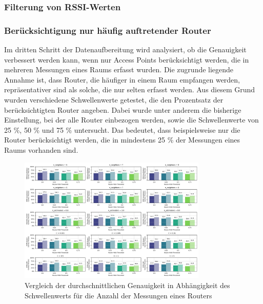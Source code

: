 \subsubsection{Filterung von RSSI-Werten}
\subsubsection{Berücksichtigung nur häufig auftretender Router}

Im dritten Schritt der Datenaufbereitung wird analysiert, ob die Genauigkeit verbessert werden kann, wenn nur Access Points berücksichtigt werden, die in mehreren Messungen eines Raums erfasst wurden. Die zugrunde liegende Annahme ist, dass Router, die häufiger in einem Raum empfangen werden, repräsentativer sind als solche, die nur selten erfasst werden. Aus diesem Grund wurden verschiedene Schwellenwerte getestet, die den Prozentsatz der berücksichtigten Router angeben. Dabei wurde unter anderem die bisherige Einstellung, bei der alle Router einbezogen werden, sowie die Schwellenwerte von 25 \%, 50 \% und 75 \% untersucht. Das bedeutet, dass beispielsweise nur die Router berücksichtigt werden, die in mindestens 25 \% der Messungen eines Raums vorhanden sind.

\begin{figure}[H]
    \centering
    \includegraphics[width=0.8\textwidth]{images/08_router_presence_threshold_03.png}
    \caption{Vergleich der durchschnittlichen Genauigkeit in Abhängigkeit des Schwellenwerts für die Anzahl der Messungen eines Routers}
    \label{fig:08_router_presence_threshold_03}
\end{figure}

